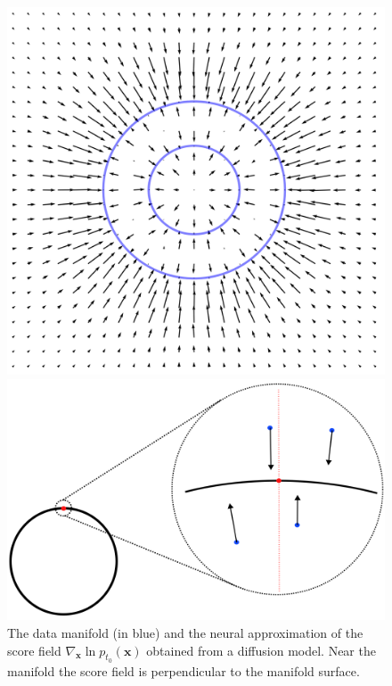 \begin{figure}[h]
    \centering
    \begin{minipage}[t]{0.49\linewidth}
        \centering
        \includegraphics[width=\linewidth]{Chapter3/figures/score_field.png}
        \caption{The data manifold (in blue) and the neural approximation of the score field $\nabla_\textbf{x} \ln p_{t_0}(\textbf{x})$ obtained from a diffusion model. Near the manifold the score field is perpendicular to the manifold surface.}
        \label{ch3:fig:score_field}
    \end{minipage}
    \hfill
    \begin{minipage}[t]{0.49\linewidth}
        \centering
        \includegraphics[width=\linewidth]{Chapter3/figures/drawing.png}

\end{minipage}
\end{figure}
